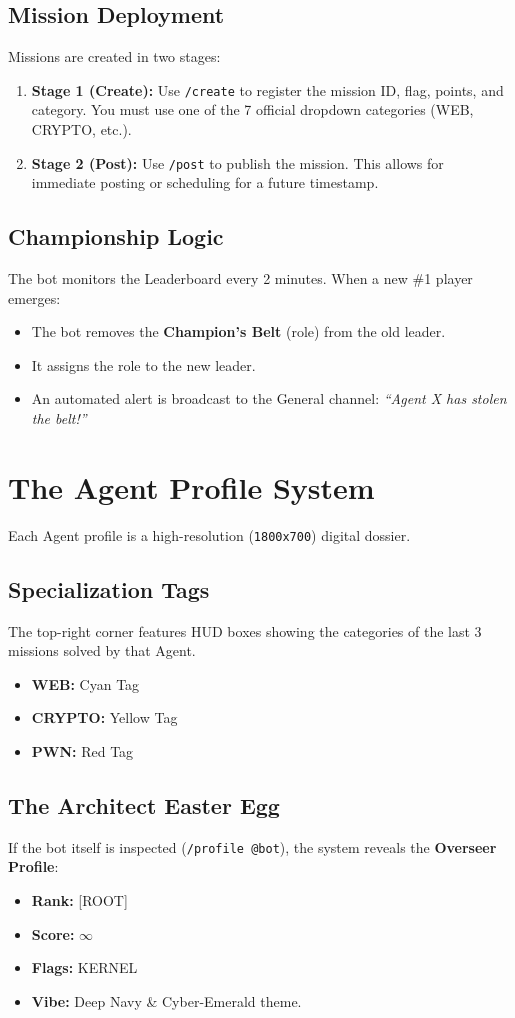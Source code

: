 \documentclass[12pt,a4paper]{article}
\begin{document}
\subsection{Mission Deployment}
Missions are created in two stages:
\begin{enumerate}
    \item \textbf{Stage 1 (Create):} Use \texttt{/create} to register the mission ID, flag, points, and category. You must use one of the 7 official dropdown categories (WEB, CRYPTO, etc.).
    \item \textbf{Stage 2 (Post):} Use \texttt{/post} to publish the mission. This allows for immediate posting or scheduling for a future timestamp.
\end{enumerate}

\subsection{Championship Logic}
The bot monitors the Leaderboard every 2 minutes. When a new \#1 player emerges:
\begin{itemize}
    \item The bot removes the \textbf{Champion's Belt} (role) from the old leader.
    \item It assigns the role to the new leader.
    \item An automated alert is broadcast to the General channel: \textit{``Agent X has stolen the belt!''}
\end{itemize}

\section{The Agent Profile System}
Each Agent profile is a high-resolution (\texttt{1800x700}) digital dossier.

\subsection{Specialization Tags}
The top-right corner features HUD boxes showing the categories of the last 3 missions solved by that Agent.
\begin{itemize}
    \item \textbf{WEB:} Cyan Tag
    \item \textbf{CRYPTO:} Yellow Tag
    \item \textbf{PWN:} Red Tag
\end{itemize}

\subsection{The Architect Easter Egg}
If the bot itself is inspected (\texttt{/profile @bot}), the system reveals the \textbf{Overseer Profile}:
\begin{itemize}
    \item \textbf{Rank:} [ROOT]
    \item \textbf{Score:} $\infty$
    \item \textbf{Flags:} KERNEL
    \item \textbf{Vibe:} Deep Navy \& Cyber-Emerald theme.
\end{itemize}
\end{document}
